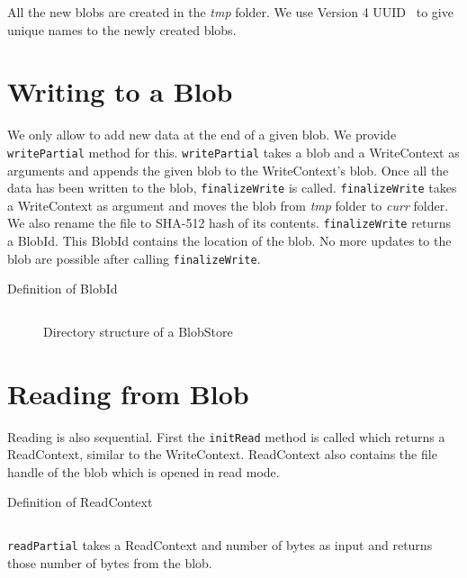 All the new blobs are created in the \textit{tmp} folder. We use Version 4 UUID~\cite{leach2005universally} to give unique names to the newly created blobs.

\section{Writing to a Blob}
We only allow to add new data at the end of a given blob. We provide \texttt{writePartial} method for this. \texttt{writePartial} takes a blob and a WriteContext as arguments and appends the given blob to the WriteContext's blob.
Once all the data has been written to the blob, \texttt{finalizeWrite} is called. \texttt{finalizeWrite} takes a WriteContext as argument and moves the blob from \textit{tmp} folder to \textit{curr} folder. We also rename the file to SHA-512 hash of its contents.
\texttt{finalizeWrite} returns a BlobId. This BlobId contains the location of the blob.
No more updates to the blob are possible after calling \texttt{finalizeWrite}.

\begin{program}
  \caption{Definition of BlobId}
  \label{prog:defblobid}
  \inputminted{haskell}{hs/blobid.hs}
\end{program}

\begin{figure}[hbt]
  \caption{Directory structure of a BlobStore}
  \label{fig:blobstore-dirstructure}
\end{figure}

\section{Reading from Blob}
Reading is also sequential. First the \texttt{initRead} method is called which returns a ReadContext, similar to the WriteContext. ReadContext also contains the file handle of the blob which is opened in read mode.

\begin{program}
  \caption{Definition of ReadContext}
  \label{fig:defreadcontext}
  \inputminted{haskell}{hs/readcontext.hs}
\end{program}

\texttt{readPartial} takes a ReadContext and number of bytes as input and returns those number of bytes from the blob.

